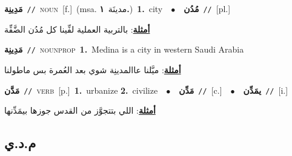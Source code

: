 \documentclass[10pt,a4paper,twoside]{article} %
\begin{document}
\begin{multicols}{2}
{\setlength\topsep{0pt}\textbf{\foreignlanguage{arabic}{مَدِينِة}}\ {\color{gray}\texttt{//}\color{black}}\ \textsc{noun}\ [f.]\ \color{gray}(msa. \foreignlanguage{arabic}{مدينَة}~\foreignlanguage{arabic}{\textbf{١.}})\color{black}\ \textbf{1.}~city\ \ $\bullet$\ \ \setlength\topsep{0pt}\textbf{\foreignlanguage{arabic}{مُدُن}}\ {\color{gray}\texttt{//}\color{black}}\ [pl.]\  \begin{flushright}\color{gray}\foreignlanguage{arabic}{\textbf{\underline{\foreignlanguage{arabic}{أمثلة}}}: بالتربية العملية لفِّينا كل مُدُن الضَّفِّة}\end{flushright}\color{black}} \vspace{2mm}

{\setlength\topsep{0pt}\textbf{\foreignlanguage{arabic}{مَدِينِة}}\ {\color{gray}\texttt{//}\color{black}}\ \textsc{noun\textunderscore prop}\ \textbf{1.}~Medina is a city in western Saudi Arabia\  \begin{flushright}\color{gray}\foreignlanguage{arabic}{\textbf{\underline{\foreignlanguage{arabic}{أمثلة}}}: ميَّلنا عاالمدينِة شوي بعد العُمرة بس ماطولنا}\end{flushright}\color{black}} \vspace{2mm}

{\setlength\topsep{0pt}\textbf{\foreignlanguage{arabic}{مَدَّن}}\ {\color{gray}\texttt{//}\color{black}}\ \textsc{verb}\ [p.]\ \textbf{1.}~urbanize  \textbf{2.}~civilize\ \ $\bullet$\ \ \setlength\topsep{0pt}\textbf{\foreignlanguage{arabic}{مَدِّن}}\ {\color{gray}\texttt{//}\color{black}}\ [c.]\ \ $\bullet$\ \ \setlength\topsep{0pt}\textbf{\foreignlanguage{arabic}{يمَدِّن}}\ {\color{gray}\texttt{//}\color{black}}\ [i.]\  \begin{flushright}\color{gray}\foreignlanguage{arabic}{\textbf{\underline{\foreignlanguage{arabic}{أمثلة}}}: اللي بتتجوَّز من القدس جوزها بيمَدِّنها}\end{flushright}\color{black}} \vspace{2mm}

\vspace{-3mm}
\subsection*{\color{blue}\foreignlanguage{arabic}{م.د.ي}\color{blue}{}} 


\end{multicols}
\end{document}
